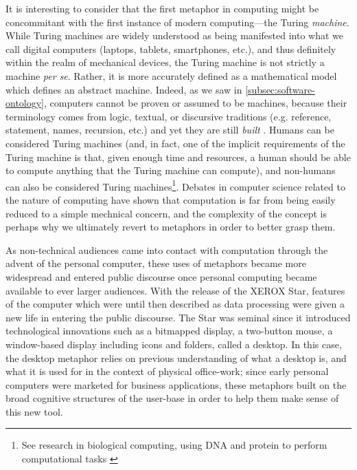 It is interesting to consider that the first metaphor in computing might be concommitant with the first instance of modern computing—the Turing \emph{machine}. While Turing machines are widely understood as being manifested into what we call digital computers (laptops, tablets, smartphones, etc.), and thus definitely within the realm of mechanical devices, the Turing machine is not strictly a machine \emph{per se}. Rather, it is more accurately defined as a mathematical model which defines an abstract machine. Indeed, as we saw in \autoref{subsec:software-ontology}, computers cannot be proven or assumed to be machines, because their terminology comes from logic, textual, or discursive traditions (e.g. reference, statement, names, recursion, etc.) and yet they are still \emph{built} \citep{smith_origin_1998}. Humans can be considered Turing machines (and, in fact, one of the implicit requirements of the Turing machine is that, given enough time and resources, a human should be able to compute anything that the Turing machine can compute), and non-humans can also be considered Turing machines\footnote{See research in biological computing, using DNA and protein to perform computational tasks \citep{garfinkel_biological_2000}}. Debates in computer science related to the nature of computing \citep{rapaport_philosophy_2005} have shown that computation is far from being easily reduced to a simple mechnical concern, and the complexity of the concept is perhaps why we ultimately revert to metaphors in order to better grasp them.

As non-technical audiences came into contact with computation through the advent of the personal computer, these uses of metaphors became more widespread and entered public discourse once personal computing became available to ever larger audiences. With the release of the XEROX Star, features of the computer which were until then described as data processing were given a new life in entering the public discourse. The Star was seminal since it introduced technological innovations such as a bitmapped display, a two-button mouse, a window-based display including icons and folders, called a desktop. In this case, the desktop metaphor relies on previous understanding of what a desktop is, and what it is used for in the context of physical office-work; since early personal computers were marketed for business applications, these metaphors built on the broad cognitive structures of the user-base in order to help them make sense of this new tool.

